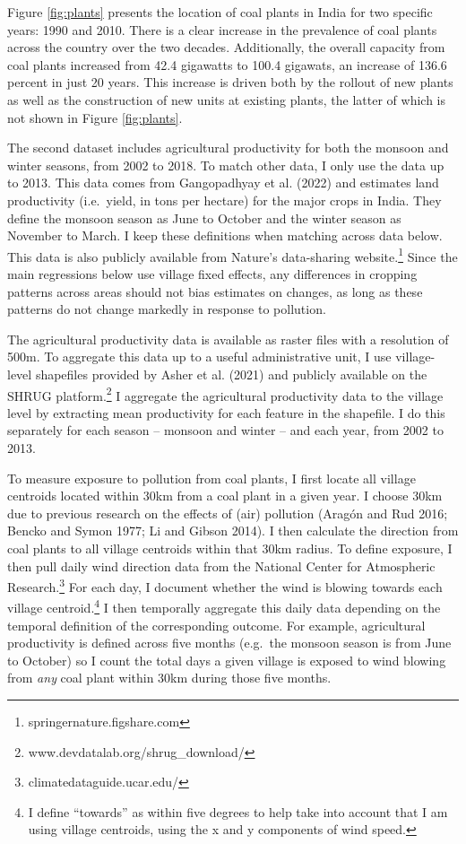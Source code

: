 \documentclass[
]{article}
\begin{document}
Figure \ref{fig:plants} presents the location of coal plants in India for two specific years: 1990 and 2010. There is a clear increase in the prevalence of coal plants across the country over the two decades. Additionally, the overall capacity from coal plants increased from 42.4 gigawatts to 100.4 gigawats, an increase of 136.6 percent in just 20 years. This increase is driven both by the rollout of new plants as well as the construction of new units at existing plants, the latter of which is not shown in Figure \ref{fig:plants}.

The second dataset includes agricultural productivity for both the monsoon and winter seasons, from 2002 to 2018. To match other data, I only use the data up to 2013. This data comes from Gangopadhyay et al. (2022) and estimates land productivity (i.e.~yield, in tons per hectare) for the major crops in India. They define the monsoon season as June to October and the winter season as November to March. I keep these definitions when matching across data below. This data is also publicly available from Nature's data-sharing website.\footnote{springernature.figshare.com} Since the main regressions below use village fixed effects, any differences in cropping patterns across areas should not bias estimates on changes, as long as these patterns do not change markedly in response to pollution.

The agricultural productivity data is available as raster files with a resolution of 500m. To aggregate this data up to a useful administrative unit, I use village-level shapefiles provided by Asher et al. (2021) and publicly available on the SHRUG platform.\footnote{www.devdatalab.org/shrug\_download/} I aggregate the agricultural productivity data to the village level by extracting mean productivity for each feature in the shapefile. I do this separately for each season -- monsoon and winter -- and each year, from 2002 to 2013.

To measure exposure to pollution from coal plants, I first locate all village centroids located within 30km from a coal plant in a given year. I choose 30km due to previous research on the effects of (air) pollution (Aragón and Rud 2016; Bencko and Symon 1977; Li and Gibson 2014). I then calculate the direction from coal plants to all village centroids within that 30km radius. To define exposure, I then pull daily wind direction data from the National Center for Atmospheric Research.\footnote{climatedataguide.ucar.edu/} For each day, I document whether the wind is blowing towards each village centroid.\footnote{I define ``towards'' as within five degrees to help take into account that I am using village centroids, using the x and y components of wind speed.} I then temporally aggregate this daily data depending on the temporal definition of the corresponding outcome. For example, agricultural productivity is defined across five months (e.g.~the monsoon season is from June to October) so I count the total days a given village is exposed to wind blowing from \emph{any} coal plant within 30km during those five months.
\end{document}
